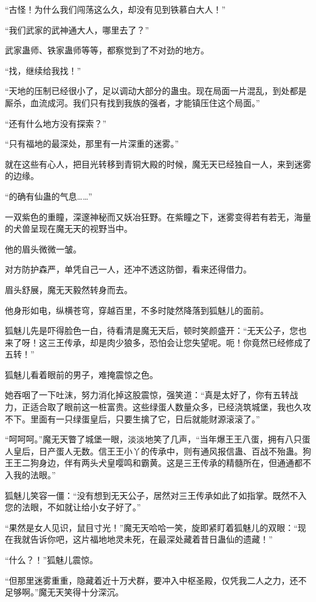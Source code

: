 \begin{this_body}
“古怪！为什么我们闯荡这么久，却没有见到铁慕白大人！”

“我们武家的武神通大人，哪里去了？”

武家蛊师、铁家蛊师等等，都察觉到了不对劲的地方。

“找，继续给我找！”

“天地的压制已经很小了，足以调动大部分的蛊虫。现在局面一片混乱，到处都是厮杀，血流成河。我们只有找到我族的强者，才能镇压住这个局面。”

“还有什么地方没有探索？”

“只有福地的最深处，那里有一片深重的迷雾。”

就在这些有心人，把目光转移到青铜大殿的时候，魔无天已经独自一人，来到迷雾的边缘。

“的确有仙蛊的气息……”

一双紫色的重瞳，深邃神秘而又妖冶狂野。在紫瞳之下，迷雾变得若有若无，海量的犬兽呈现在魔无天的视野当中。

他的眉头微微一皱。

对方防护森严，单凭自己一人，还冲不透这防御，看来还得借力。

眉头舒展，魔无天毅然转身而去。

他身形如电，纵横苍穹，穿越百里，不多时陡然降落到狐魅儿的面前。

狐魅儿先是吓得脸色一白，待看清是魔无天后，顿时笑颜盛开：“无天公子，您也来了呀！这三王传承，却是肉少狼多，恐怕会让您失望呢。呃！你竟然已经修成了五转！”

狐魅儿看着眼前的男子，难掩震惊之色。

她吞咽了一下吐沫，努力消化掉这股震惊，强笑道：“真是太好了，你有五转战力，正适合取了眼前这一桩富贵。这些绿蛋人数量众多，已经浇筑城堡，我也久攻不下。里面有一只绿蛋皇后，只要生擒了它，日后就能财源滚滚了。”

“呵呵呵。”魔无天瞥了城堡一眼，淡淡地笑了几声，“当年爆王王八蛋，拥有八只蛋人皇后，日产蛋人无数。信王王小丫的传承中，则有通风报信蛊、百战不殆蛊。狗王王二狗身边，伴有两头犬皇嘤鸣和霸黄。这是三王传承的精髓所在，但通通都不入我的法眼。”

狐魅儿笑容一僵：“没有想到无天公子，居然对三王传承如此了如指掌。既然不入您的法眼，不如就让给小女子好了。”

“果然是女人见识，鼠目寸光！”魔无天哈哈一笑，旋即紧盯着狐魅儿的双眼：“现在我就告诉你吧，这片福地地灵未死，在最深处藏着昔日蛊仙的遗藏！”

“什么？！”狐魅儿震惊。

“但那里迷雾重重，隐藏着近十万犬群，要冲入中枢圣殿，仅凭我二人之力，还不足够啊。”魔无天笑得十分深沉。


\end{this_body}

